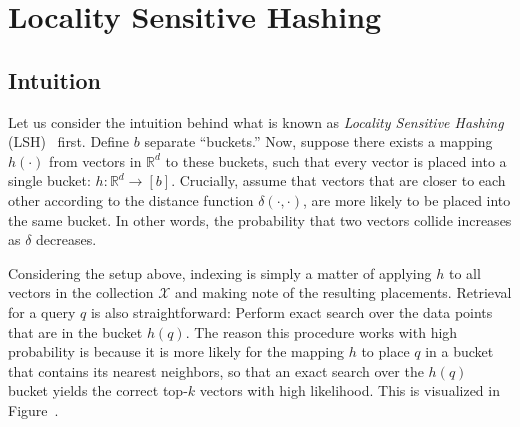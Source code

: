 \chapter{Locality Sensitive Hashing}
\label{chapter:lsh}


\section{Intuition}
\label{section:lsh:intuition}
Let us consider the intuition behind what is known as \emph{Locality Sensitive Hashing}
(LSH)~\citep{lsh} first.
Define $b$ separate ``buckets.'' Now, suppose there exists a mapping $h(\cdot)$
from vectors in $\mathbb{R}^d$ to these buckets, such that every vector is placed into
a single bucket: $h: \mathbb{R}^d \rightarrow [b]$. Crucially, assume that vectors that are closer to each other
according to the distance function $\delta(\cdot, \cdot)$, are more likely to be placed
into the same bucket. In other words, the probability that two vectors collide
increases as $\delta$ decreases.

Considering the setup above, indexing is simply a matter of applying $h$ to
all vectors in the collection $\mathcal{X}$ and making note of the resulting placements.
Retrieval for a query $q$ is also straightforward: Perform exact
search over the data points that are in the bucket $h(q)$.
The reason this procedure works with high probability is because it
is more likely for the mapping $h$ to place $q$ in a bucket that contains
its nearest neighbors, so that an exact search over the $h(q)$ bucket yields the correct
top-$k$ vectors with high likelihood. This is visualized in Figure~.

